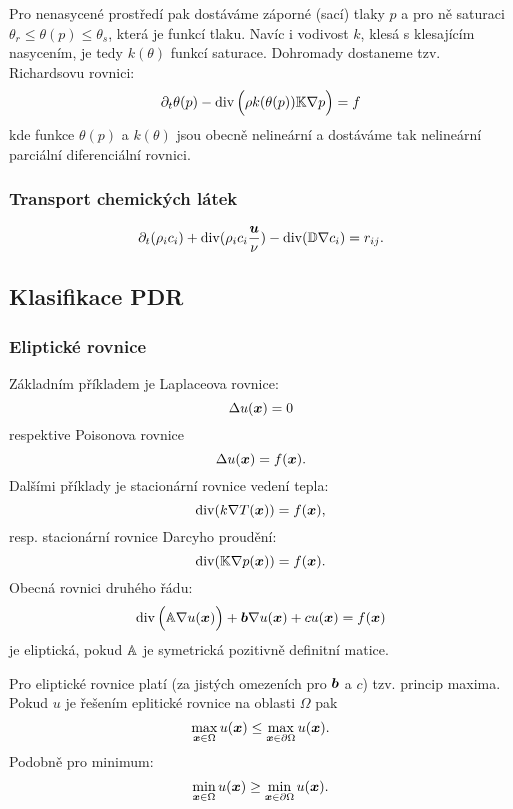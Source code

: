 Pro nenasycené prostředí pak dostáváme záporné (sací) tlaky $p$ a pro ně saturaci $\theta_r \le \theta(p) \le \theta_s$, která je funkcí tlaku. 
Navíc i vodivost $k$, klesá s klesajícím nasycením, je tedy $k(\theta)$ funkcí saturace. Dohromady dostaneme tzv. Richardsovu rovnici:
\[
    \partial_t \theta(p) -\operatorname{div}\Big( \rho k(\theta(p)) {\mathbb{K}} \nabla p\Big) = f
\]
kde funkce $\theta(p)$ a $k(\theta)$ jsou obecně nelineární a dostáváme tak nelineární parciální diferenciální rovnici.



\subsubsection{Transport chemických látek}
\begin{equation}
    \partial_t (\rho_i c_i) + \operatorname{div} (\rho_i c_i \frac{\mathbf{\boldsymbol{u}}}{\nu}) - \operatorname{div}( {\mathbb{D}} \nabla c_i) = r_{ij}.
\end{equation}











\subsection{Klasifikace PDR}

\subsubsection{Eliptické rovnice}
Základním příkladem je Laplaceova rovnice:
\[
    \Delta u(\mathbf{\boldsymbol{x}}) = 0
\]
respektive Poisonova rovnice
\[
    \Delta u(\mathbf{\boldsymbol{x}}) = f(\mathbf{\boldsymbol{x}}).
\]
Dalšími příklady je stacionární rovnice vedení tepla:
\[
    \operatorname{div}( k \nabla T(\mathbf{\boldsymbol{x}}) ) = f(\mathbf{\boldsymbol{x}}),
\]
resp. stacionární rovnice Darcyho proudění:
\[
    \operatorname{div}( {\mathbb{K}} \nabla p(\mathbf{\boldsymbol{x}})) = f(\mathbf{\boldsymbol{x}}).
\]
Obecná rovnici druhého řádu:
\[
  \operatorname{div}\Big( {\mathbb{A}} \nabla u(\mathbf{\boldsymbol{x}})\Big) + \mathbf{\boldsymbol{b}} \nabla u(\mathbf{\boldsymbol{x}}) + c u(\mathbf{\boldsymbol{x}})= f(\mathbf{\boldsymbol{x}})
\]
je eliptická, pokud ${\mathbb{A}}$ je symetrická pozitivně definitní matice.

Pro eliptické rovnice platí (za jistých omezeních pro $\mathbf{\boldsymbol{b}}$ a $c$) tzv. princip maxima. Pokud $u$ je řešením eplitické rovnice na oblasti $\Omega$
pak 
\[
    \max_{\mathbf{\boldsymbol{x}} \in \Omega} u(\mathbf{\boldsymbol{x}}) \le \max_{\mathbf{\boldsymbol{x}} \in \partial \Omega}  u(\mathbf{\boldsymbol{x}}).
\]
Podobně pro minimum:
\[
    \min_{\mathbf{\boldsymbol{x}} \in \Omega} u(\mathbf{\boldsymbol{x}}) \ge \min_{\mathbf{\boldsymbol{x}} \in \partial \Omega}  u(\mathbf{\boldsymbol{x}}).
\]


